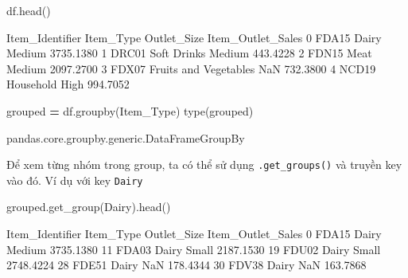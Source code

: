 \documentclass[
]{book}
\newenvironment{Shaded}{\begin{snugshade}}{\end{snugshade}}
\newcommand{\BuiltInTok}[1]{#1}
\newcommand{\NormalTok}[1]{#1}
\newcommand{\OperatorTok}[1]{\textcolor[rgb]{0.81,0.36,0.00}{\textbf{#1}}}
\newcommand{\StringTok}[1]{\textcolor[rgb]{0.31,0.60,0.02}{#1}}
\begin{document}
\begin{Shaded}
\begin{Highlighting}[]
\NormalTok{df.head()}
\end{Highlighting}
\end{Shaded}

\begin{Shaded}
\begin{Highlighting}[]
\NormalTok{  Item\_Identifier              Item\_Type Outlet\_Size  Item\_Outlet\_Sales}
\NormalTok{0           FDA15                  Dairy      Medium          3735.1380}
\NormalTok{1           DRC01            Soft Drinks      Medium           443.4228}
\NormalTok{2           FDN15                   Meat      Medium          2097.2700}
\NormalTok{3           FDX07  Fruits and Vegetables         NaN           732.3800}
\NormalTok{4           NCD19              Household        High           994.7052}
\end{Highlighting}
\end{Shaded}

\begin{Shaded}
\begin{Highlighting}[]
\NormalTok{grouped }\OperatorTok{=}\NormalTok{ df.groupby(}\StringTok{\textquotesingle{}Item\_Type\textquotesingle{}}\NormalTok{)}
\BuiltInTok{type}\NormalTok{(grouped)}
\end{Highlighting}
\end{Shaded}

\begin{Shaded}
\begin{Highlighting}[]
\NormalTok{pandas.core.groupby.generic.DataFrameGroupBy}
\end{Highlighting}
\end{Shaded}

Để xem từng nhóm trong group, ta có thể sử dụng \texttt{.get\_groups()} và truyền key vào đó. Ví dụ với key \texttt{Dairy}

\begin{Shaded}
\begin{Highlighting}[]
\NormalTok{grouped.get\_group(}\StringTok{\textquotesingle{}Dairy\textquotesingle{}}\NormalTok{).head()}
\end{Highlighting}
\end{Shaded}

\begin{Shaded}
\begin{Highlighting}[]
\NormalTok{   Item\_Identifier Item\_Type Outlet\_Size  Item\_Outlet\_Sales}
\NormalTok{0            FDA15     Dairy      Medium          3735.1380}
\NormalTok{11           FDA03     Dairy       Small          2187.1530}
\NormalTok{19           FDU02     Dairy       Small          2748.4224}
\NormalTok{28           FDE51     Dairy         NaN           178.4344}
\NormalTok{30           FDV38     Dairy         NaN           163.7868}
\end{Highlighting}
\end{Shaded}
\end{document}
